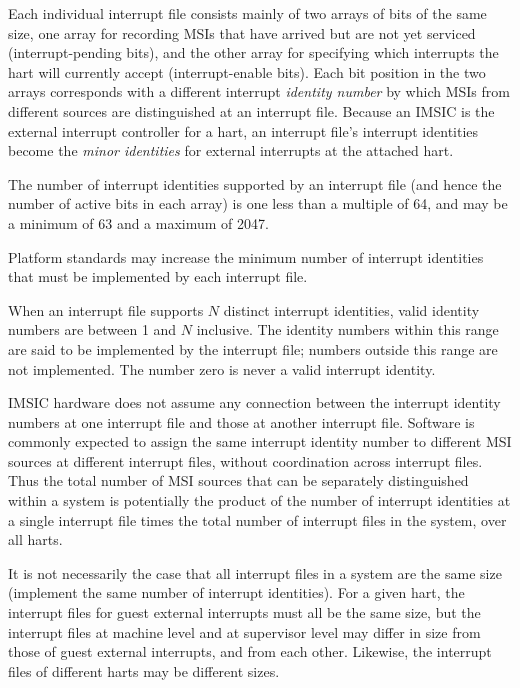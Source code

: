 Each individual interrupt file consists mainly of two arrays of bits
of the same size, one array for recording MSIs that have arrived but
are not yet serviced (interrupt-pending bits), and the other array
for specifying which interrupts the hart will currently accept
(interrupt-enable bits).
Each bit position in the two arrays corresponds with a different
interrupt \emph{identity number} by which MSIs from different sources
are distinguished at an interrupt file.
Because an IMSIC is the external interrupt controller for
a hart, an interrupt file's interrupt identities become the
\emph{minor identities} for external interrupts at the attached hart.

The number of interrupt identities supported by an interrupt file
(and hence the number of active bits in each array) is one less than a
multiple of 64, and may be a minimum of 63 and a maximum of 2047.

\begin{commentary}
Platform standards may increase the minimum number of interrupt
identities that must be implemented by each interrupt file.
\end{commentary}

When an interrupt file supports $N$ distinct interrupt identities,
valid identity numbers are between 1 and $N$ inclusive.
The identity numbers within this range are said to be implemented by
the interrupt file;
numbers outside this range are not implemented.
The number zero is never a valid interrupt identity.

IMSIC hardware does not assume any connection between the interrupt
identity numbers at one interrupt file and those at another interrupt
file.
Software is commonly expected to assign the same interrupt identity
number to different MSI sources at different interrupt files, without
coordination across interrupt files.
Thus the total number of MSI sources that can be separately
distinguished within a system is potentially the product of the number
of interrupt identities at a single interrupt file times the total
number of interrupt files in the system, over all harts.

It is not necessarily the case that all interrupt files in a system are
the same size (implement the same number of interrupt identities).
For a given hart, the interrupt files for guest external interrupts
must all be the same size, but the interrupt files at machine level
and at supervisor level may differ in size from those of guest external
interrupts, and from each other.
Likewise, the interrupt files of different harts may be different
sizes.

